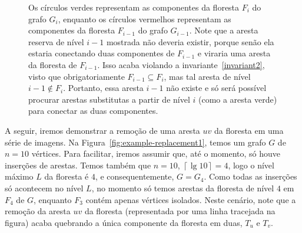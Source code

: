 \begin{figure}[H]
    \centering
    \caption{Os círculos verdes representam as componentes da floresta $F_i$ do grafo $G_i$, enquanto os círculos vermelhos representam as componentes da floresta $F_{i-1}$ do grafo $G_{i-1}$. Note que a aresta reserva de nível $i-1$ mostrada não deveria existir, porque senão ela estaria conectando duas componentes de $F_{i-1}$ e viraria uma aresta da floresta de $F_{i-1}$. Isso acaba violando a invariante~\ref{invariant2}, visto que obrigatoriamente $F_{i-1} \subseteq F_i$, mas tal aresta de nível $i-1 \notin F_i$. Portanto, essa aresta $i-1$ não existe e só será possível procurar arestas substitutas a partir de nível $i$ (como a aresta verde) para conectar as duas componentes.}
    \label{fig:why-not-search-in-less-or-equal-than-i}
\end{figure}

\raggedbottom

A seguir, iremos demonstrar a remoção de uma aresta $uv$ da floresta em uma série de imagens. Na Figura~\ref{fig:example-replacement1}, temos um grafo $G$ de $n = 10$ vértices. Para facilitar, iremos assumir que, até o momento, só houve inserções de arestas. Temos também que $n = 10$, $\left\lceil \lg 10 \right\rceil = 4$, logo o nível máximo $L$ da floresta é $4$, e consequentemente, $G = G_4$. Como todas as inserções só acontecem no nível $L$, no momento só temos arestas da floresta de nível $4$ em $F_4$ de $G$, enquanto $F_3$ contém apenas vértices isolados. Neste cenário, note que 
a remoção da aresta $uv$ da floresta (representada por uma linha tracejada na figura) acaba quebrando a única componente da floresta em duas, $T_u$ e $T_v$. 

